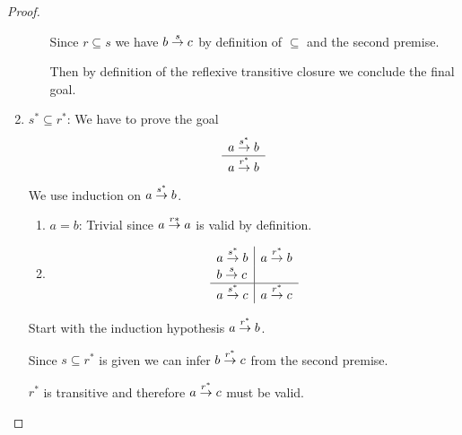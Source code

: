 \begin{theorem}
\begin{proof}
\begin{enumerate}
\begin{enumerate}
                        Since $r \subseteq s$ we have $b \stackrel{s}{\to} c$ by
                        definition of $\subseteq$ and the second premise.

                        Then by definition of the reflexive transitive closure
                        we conclude the final goal.
                \end{enumerate}

            \item $s^* \subseteq r^*$: We have to prove the goal
                $$
                \begin{array}{c} a \stackrel{s^*}{\to} b \\ \hline a \stackrel{r^*}{\to} b\end{array}
                $$
                We use induction on $a \stackrel{s^*}{\to} b$.
                \begin{enumerate}
                    \item $a = b$: Trivial since $a \stackrel{r*}{\to} a$ is valid by
                        definition.

                    \item
                        $$
                        \begin{array}{l|l}
                            a \stackrel{s^*}{\to} b
                            &
                            a \stackrel{r^*}{\to} b
                            \\
                            b \stackrel{s}{\to} c
                            \\
                            \hline
                            a \stackrel{s^*}{\to} c
                            &
                            a \stackrel{r^*}{\to} c
                        \end{array}
                        $$
                \end{enumerate}

                Start with the induction hypothesis $a \stackrel{r^*}{\to} b$.

                Since $s \subseteq r^*$ is given we can infer $b \stackrel{r^*}{\to} c$
                from the second premise.

                $r^*$ is transitive and therefore $a \stackrel{r^*}{\to} c$ must be
                valid.
        \end{enumerate}
    \end{proof}
\end{theorem}




